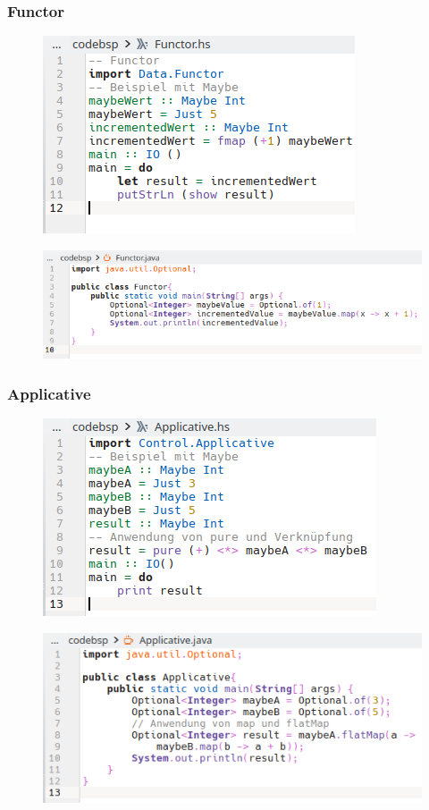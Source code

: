 \documentclass{beamer}
\begin{document}
\begin{frame}
\frametitle{Functor}

 \begin{figure}
     \centering
     \includegraphics[scale=0.5]{bilder/FP-Functor-hs.png}
 \end{figure}
 \begin{figure}
     \centering
     \includegraphics[scale=0.5]{bilder/FP-Functor-java.png}
 \end{figure}

\end{frame}

\begin{frame}
\frametitle{Applicative}
 \begin{figure}
     \centering
     \includegraphics[scale=0.5]{bilder/FP-Applicative-hs.png}
 \end{figure}
 \begin{figure}
     \centering
     \includegraphics[scale=0.5]{bilder/FP-Applicative-java.png}
 \end{figure}
\end{frame}
\end{document}
